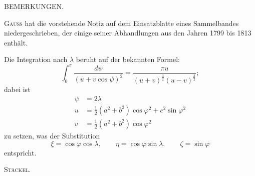 %
\begin{center}BEMERKUNGEN.\end{center}

\textsc{Gauss} hat die vorstehende Notiz auf dem Einsatzblatte eines Sammelbandes niedergeschrieben, der einige seiner Abhandlungen aus den Jahren 1799 bis 1813 enthält.

Die Integration nach $\lambda$ beruht auf der bekannten Formel:
\[
\int_0^\pi\frac{d\psi}{(u+v\cos\psi)^2}=\frac{\pi u}{(u+v)^{\frac32}(u-v)^{\frac32}};
\]
dabei ist
\[
\begin{aligned}
\psi&=2\lambda\\
u&=\tfrac12(a^2+b^2)\cos\varphi^2+c^2\sin\varphi^2\\
v&=\tfrac12(a^2+b^2)\cos\varphi^2
\end{aligned}
\]
zu setzen, was der Substitution
\[
\xi=\cos\varphi\cos\lambda,\qquad\eta=\cos\varphi\sin\lambda,\qquad\zeta=\sin\varphi
\]
entspricht.\par\nobreak\hfill\textsc{Stäckel.}\par
